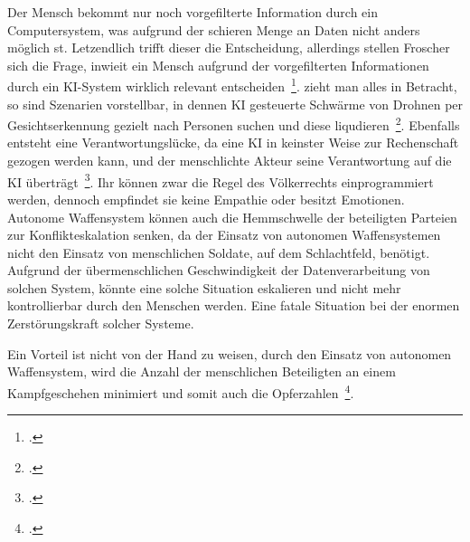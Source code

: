 Der Mensch bekommt nur noch vorgefilterte Information durch ein Computersystem, was aufgrund der schieren Menge an Daten nicht anders möglich st. Letzendlich trifft dieser
die Entscheidung, allerdings stellen Froscher sich die Frage, inwieit ein Mensch aufgrund der vorgefilterten Informationen durch ein \ac{KI}-System wirklich relevant entscheiden~\footcite[\vglf][]{Lenzen.2020}.
zieht man alles in Betracht, so sind Szenarien vorstellbar, in dennen \ac{KI} gesteuerte Schwärme von Drohnen per Gesichtserkennung gezielt nach Personen suchen und diese liqudieren~\footcite[\vglf][]{Kipper.2020}.
Ebenfalls entsteht eine Verantwortungslücke, da eine \ac{KI} in keinster Weise zur Rechenschaft gezogen werden kann, und der menschlichte Akteur seine Verantwortung auf die 
\ac{KI} überträgt~\footcite[\vglf][]{Heinrichs.2022}.
Ihr können zwar die Regel des Völkerrechts einprogrammiert werden, dennoch empfindet sie keine Empathie oder besitzt Emotionen.
Autonome Waffensystem können auch die Hemmschwelle der beteiligten Parteien zur Konflikteskalation senken, da der Einsatz von autonomen Waffensystemen nicht den Einsatz 
von menschlichen Soldate, auf dem Schlachtfeld, benötigt.
Aufgrund der übermenschlichen Geschwindigkeit der Datenverarbeitung von solchen System, könnte eine solche Situation eskalieren und nicht mehr kontrollierbar durch den Menschen werden.
Eine fatale Situation bei der enormen Zerstörungskraft solcher Systeme.

Ein Vorteil ist nicht von der Hand zu weisen, durch den Einsatz von autonomen Waffensystem, wird die Anzahl der menschlichen Beteiligten an einem Kampfgeschehen minimiert und 
somit auch die Opferzahlen~\footcite[\vglf][]{Kipper.2020}.